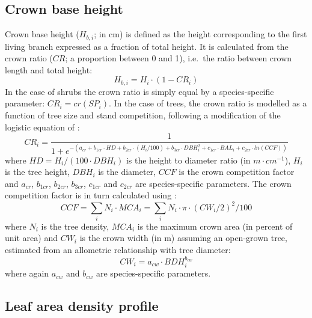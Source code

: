 \documentclass[]{book}
\begin{document}
\hypertarget{crownbaseheight}{%
\subsection{Crown base height}\label{crownbaseheight}}

Crown base height (\(H_{b,i}\); in cm) is defined as the height corresponding to the first living branch expressed as a fraction of total height. It is calculated from the crown ratio (\(CR\); a proportion between 0 and 1), i.e.~the ratio between crown length and total height:
\begin{equation}
H_{b,i} = H_{i} \cdot (1 - CR_i)
\label{eq:CrownHeight}
\end{equation}
In the case of shrubs the crown ratio is simply equal by a species-specific parameter: \(CR_i = cr(SP_i)\). In the case of trees, the crown ratio is modelled as a function of tree size and stand competition, following a modification of the logistic equation of \citet{Hasenauer1996}:
\begin{equation}
CR_i = \frac{1}{1+e^{-(a_{cr}+b_{1cr}\cdot HD +b_{2cr} \cdot (H_i/100)+b_{3cr} \cdot DBH_i^2+c_{1cr} \cdot BAL_i + c_{2cr} \cdot ln(CCF))}}
\label{eq:treecrownratio}
\end{equation}
where \(HD = H_i/(100\cdot DBH_i)\) is the height to diameter ratio (in \(m\cdot cm^{-1}\)), \(H_i\) is the tree height, \(DBH_i\) is the diameter, \(CCF\) is the crown competition factor and \(a_{cr}\), \(b_{1cr}\), \(b_{2cr}\), \(b_{3cr}\), \(c_{1cr}\) and \(c_{2cr}\) are species-specific parameters. The crown competition factor is in turn calculated using \citep{Krajicek1961}:
\begin{equation}
CCF = \sum_{i}{N_i \cdot MCA_i}= \sum_{i}{N_i \cdot \pi \cdot (CW_i/2)^2/100}
\end{equation}
where \(N_i\) is the tree density, \(MCA_i\) is the maximum crown area (in percent of unit area) and \(CW_i\) is the crown width (in m) assuming an open-grown tree, estimated from an allometric relationship with tree diameter:
\begin{equation}
CW_i = a_{cw}\cdot BDH_i^{b_{cw}} 
\end{equation}
where again \(a_{cw}\) and \(b_{cw}\) are species-specific parameters.

\hypertarget{ladprofile}{%
\subsection{Leaf area density profile}\label{ladprofile}}
\end{document}
